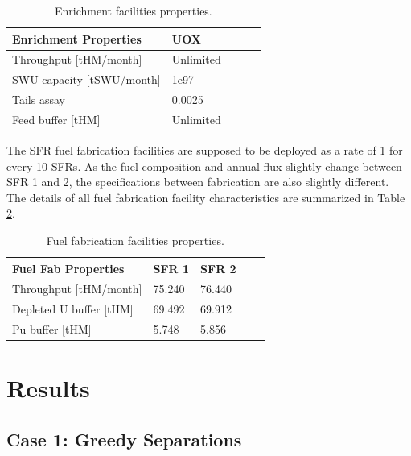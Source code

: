 \documentclass[12pt]{article}
\begin{document}
\begin{table}[h!]
    \centering
    \begin{tabular}{lllll}
    \hline
    Enrichment Properties      &  UOX        \\
    \hline
    Throughput [tHM/month]     &  Unlimited  \\
    SWU capacity [tSWU/month]  &  1e97       \\
    Tails assay                &  0.0025     \\
    Feed buffer [tHM]          &  Unlimited  \\
    \hline
    \end{tabular}
    \caption{Enrichment facilities properties. }
    \label{tab:enrich_1}
\end{table}



The SFR fuel fabrication facilities are supposed to be deployed as a rate of 1
for every 10 SFRs.  As the fuel composition and annual flux slightly change
between SFR 1 and 2, the specifications between fabrication are also slightly
different. The details of all fuel fabrication facility characteristics are
summarized in Table \ref{tab:fuelfab_1}.

\begin{table}[h!]
    \centering
    \begin{tabular}{lllll}
    \hline
    Fuel Fab Properties      &  SFR 1   &  SFR 2   \\
    \hline
    Throughput [tHM/month]   &  75.240  &  76.440  \\
    Depleted U buffer [tHM]  &  69.492  &  69.912  \\
    Pu buffer  [tHM]         &  5.748   &  5.856   \\
    \hline
    \end{tabular}
    \caption{Fuel fabrication facilities properties.}
    \label{tab:fuelfab_1}
\end{table}


\section{Results}

\subsection{Case 1: Greedy Separations}
\end{document}
